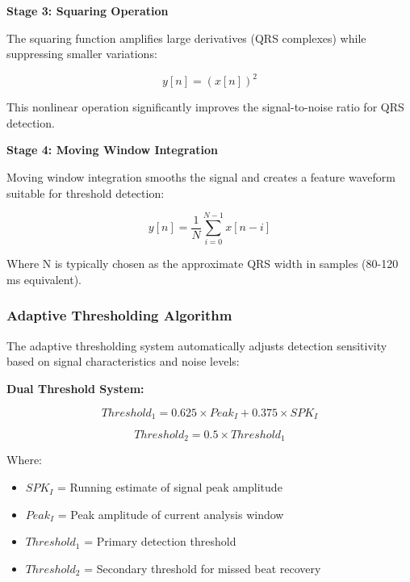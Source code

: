 \documentclass[12pt,a4paper]{article}
\begin{document}
\vspace{0.5cm}

\textbf{Stage 3: Squaring Operation}

The squaring function amplifies large derivatives (QRS complexes) while suppressing smaller variations:

\begin{equation*}
y[n] = (x[n])^2
\end{equation*}

This nonlinear operation significantly improves the signal-to-noise ratio for QRS detection.

\vspace{0.5cm}

\textbf{Stage 4: Moving Window Integration}

Moving window integration smooths the signal and creates a feature waveform suitable for threshold detection:

\begin{equation*}
y[n] = \frac{1}{N}\sum_{i=0}^{N-1}x[n-i]
\end{equation*}

Where N is typically chosen as the approximate QRS width in samples (80-120 ms equivalent).

\newpage

\subsubsection{Adaptive Thresholding Algorithm}

The adaptive thresholding system automatically adjusts detection sensitivity based on signal characteristics and noise levels:

\vspace{0.5cm}

\textbf{Dual Threshold System:}

\begin{equation*}
Threshold_1 = 0.625 \times Peak_I + 0.375 \times SPK_I
\end{equation*}

\begin{equation*}
Threshold_2 = 0.5 \times Threshold_1
\end{equation*}

Where:
\begin{itemize}
\item $SPK_I$ = Running estimate of signal peak amplitude
\item $Peak_I$ = Peak amplitude of current analysis window
\item $Threshold_1$ = Primary detection threshold
\item $Threshold_2$ = Secondary threshold for missed beat recovery
\end{itemize}
\end{document}
